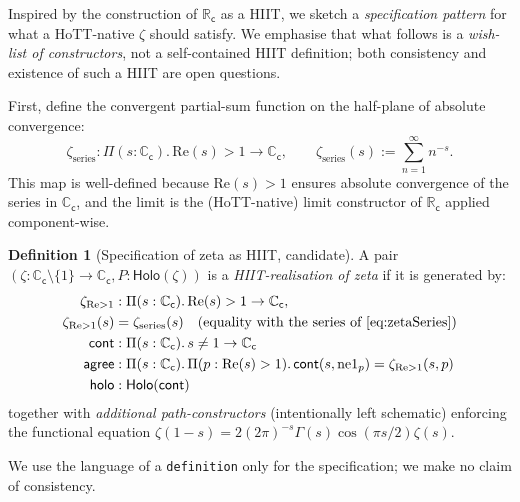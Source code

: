 \documentclass[12pt]{article}
\theoremstyle{definition}
\newtheorem{definition}[theorem]{Definition}
\theoremstyle{remark}
\newcommand{\C}{\mathbb{C}}
\newcommand{\R}{\mathbb{R}}
\newcommand{\Cc}{\C_{\mathsf{c}}}
\newcommand{\Rc}{\R_{\mathsf{c}}}
\begin{document}
Inspired by the construction of $\Rc$ as a HIIT, we sketch a
\emph{specification pattern} for what a HoTT-native $\zeta$ should
satisfy. We emphasise that what follows is a \emph{wish-list of
constructors}, not a self-contained HIIT definition; both consistency
and existence of such a HIIT are open questions.

First, define the convergent partial-sum function on the half-plane of
absolute convergence:
\begin{equation}\label{eq:zetaSeries}
\zeta_{\mathrm{series}} : \Pi(s:\Cc).\, \mathrm{Re}(s) > 1 \to \Cc, \qquad
\zeta_{\mathrm{series}}(s) := \sum_{n=1}^{\infty} n^{-s}.
\end{equation}
This map is well-defined because $\mathrm{Re}(s) > 1$ ensures absolute
convergence of the series in $\Cc$, and the limit is the (HoTT-native)
limit constructor of $\Rc$ applied component-wise.

\begin{definition}[Specification of zeta as HIIT, candidate]\label{def:ZetaHIIT}
A pair $(\zeta:\Cc \setminus \{1\} \to \Cc, P:\mathsf{Holo}(\zeta))$ is a
\emph{HIIT-realisation of zeta} if it is generated by:
\begin{align}
\zeta_{\mathrm{Re}>1} &: \Pi(s:\Cc).\, \mathrm{Re}(s) > 1 \to \Cc, \notag \\
\zeta_{\mathrm{Re}>1}(s) &= \zeta_{\mathrm{series}}(s) \quad
   \text{(equality with the series of \cref{eq:zetaSeries})} \\
\mathsf{cont} &: \Pi(s:\Cc).\, s \neq 1 \to \Cc \\
\mathsf{agree} &: \Pi(s:\Cc).\, \Pi(p:\mathrm{Re}(s) > 1).\,
   \mathsf{cont}(s, \mathrm{ne1}_p) = \zeta_{\mathrm{Re}>1}(s, p) \\
\mathsf{holo} &: \mathsf{Holo}(\mathsf{cont})
\end{align}
together with \emph{additional path-constructors} (intentionally left
schematic) enforcing the functional equation
$\zeta(1-s) = 2(2\pi)^{-s}\Gamma(s)\cos(\pi s/2)\zeta(s)$.

We use the language of a \texttt{definition} only for the specification;
we make no claim of consistency.
\end{definition}
\end{document}
